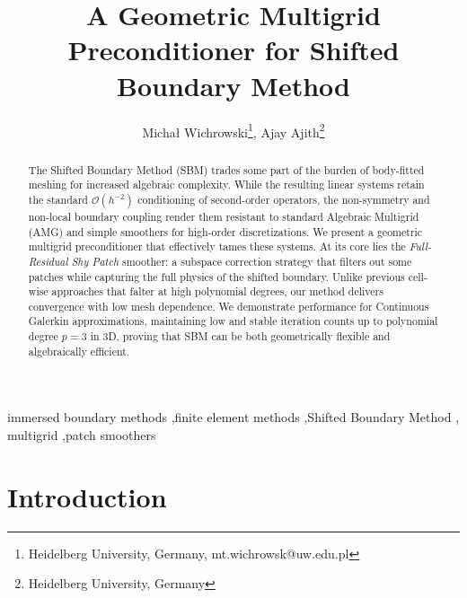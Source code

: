 \documentclass{elsarticle}
\title{A Geometric Multigrid Preconditioner for Shifted Boundary Method}
\author{Micha\l{} Wichrowski\footnote{Heidelberg University, Germany, mt.wichrowsk@uw.edu.pl},  Ajay Ajith\footnote{Heidelberg University, Germany}}
\begin{document}
\begin{abstract}
    The Shifted Boundary Method (SBM) trades some part of the burden of body-fitted meshing for increased algebraic complexity. While the resulting linear systems retain the standard $\mathcal{O}(h^{-2})$ conditioning of second-order operators, the non-symmetry and non-local boundary coupling render them resistant to standard Algebraic Multigrid (AMG) and simple smoothers for high-order discretizations. We present a geometric multigrid preconditioner that effectively tames these systems. At its core lies the \emph{Full-Residual Shy Patch} smoother: a subspace correction strategy that  filters out some patches while capturing the full physics of the shifted boundary. Unlike previous cell-wise approaches that falter at high polynomial degrees, our method delivers  convergence with low mesh dependence. We demonstrate performance for Continuous Galerkin approximations, maintaining low and stable iteration counts up to polynomial degree $p=3$ in 3D, proving that SBM can be both geometrically flexible and algebraically efficient.
\end{abstract}
\begin{keyword}
    immersed boundary methods \sep finite element methods \sep Shifted Boundary Method \sep
    multigrid \sep  patch smoothers
\end{keyword}
\maketitle
\section{Introduction}

\end{document}
